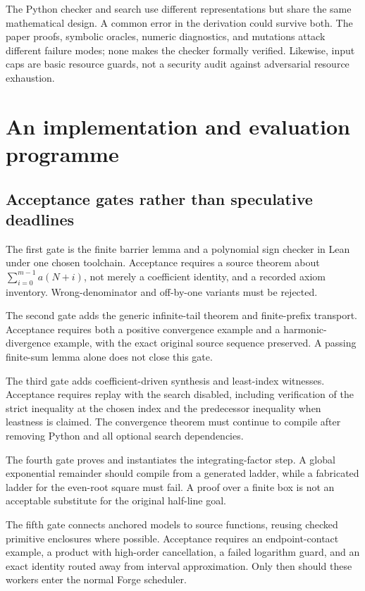 \documentclass[11pt,a4paper]{article}
\theoremstyle{definition}\newtheorem{definition}[theorem]{Definition}
\begin{document}
The Python checker and search use different representations but share the same
mathematical design. A common error in the derivation could survive both. The
paper proofs, symbolic oracles, numeric diagnostics, and mutations attack
different failure modes; none makes the checker formally verified. Likewise,
input caps are basic resource guards, not a security audit against adversarial
resource exhaustion.

\section{An implementation and evaluation programme}
\label{sec:programme}

\subsection{Acceptance gates rather than speculative deadlines}

The first gate is the finite barrier lemma and a polynomial sign checker in
Lean under one chosen toolchain. Acceptance requires a source theorem about
$\sum_{i=0}^{m-1}a(N+i)$, not merely a coefficient identity, and a recorded axiom
inventory. Wrong-denominator and off-by-one variants must be rejected.

The second gate adds the generic infinite-tail theorem and finite-prefix
transport. Acceptance requires both a positive convergence example and a
harmonic-divergence example, with the exact original source sequence preserved.
A passing finite-sum lemma alone does not close this gate.

The third gate adds coefficient-driven synthesis and least-index witnesses.
Acceptance requires replay with the search disabled, including verification of
the strict inequality at the chosen index and the predecessor inequality when
leastness is claimed. The convergence theorem must continue to compile after
removing Python and all optional search dependencies.

The fourth gate proves and instantiates the integrating-factor step. A global
exponential remainder should compile from a generated ladder, while a fabricated
ladder for the even-root square must fail. A proof over a finite box is not an
acceptable substitute for the original half-line goal.

The fifth gate connects anchored models to source functions, reusing checked
primitive enclosures where possible. Acceptance requires an endpoint-contact
example, a product with high-order cancellation, a failed logarithm guard, and
an exact identity routed away from interval approximation. Only then should
these workers enter the normal Forge scheduler.
\end{document}
